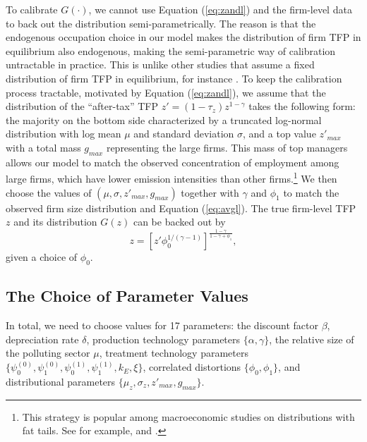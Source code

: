 \documentclass[AEJ]{AEA}
\begin{document}
To calibrate $G(\cdot)$, we cannot use Equation (\ref{eq:zandl}) and the firm-level data to back out the distribution semi-parametrically. The reason is that the endogenous occupation choice in our model makes the distribution of firm TFP in equilibrium also endogenous, making the semi-parametric way of calibration untractable in practice. This is unlike other studies that assume a fixed distribution of firm TFP in equilibrium, for instance \citet{BentoRestuccia:2016}. To keep the calibration process tractable, motivated by Equation (\ref{eq:zandl}), we assume that the distribution of the ``after-tax'' TFP $z' = (1-\tau_z)z^{1-\gamma}$ takes the following form: the majority on the bottom side characterized by a truncated log-normal distribution with log mean $\mu$ and standard deviation $\sigma$, and a top value $z'_{max}$ with a total mass $g_{max}$ representing the large firms. This mass of top managers allows our model to match the observed concentration of employment among large firms, which have lower emission intensities than other firms.\footnote{This strategy is popular among macroeconomic studies on distributions with fat tails. See for example, \citet{Castanedaetal:2003} and \citet{Guneretal:2008}.} We then choose the values of $(\mu, \sigma, z'_{max}, g_{max})$ together with $\gamma$ and $\phi_1$ to match the observed firm size distribution and Equation (\ref{eq:avgl}). The true firm-level TFP $z$ and its distribution $G(z)$ can be backed out by
\begin{equation*}
    z = \left[z'\phi_0^{1/(\gamma-1)}\right]^{\frac{1-\gamma}{1-\gamma+\phi_1}},
\end{equation*}
given a choice of $\phi_0$.

\subsection{The Choice of Parameter Values}

In total, we need to choose values for 17 parameters: the discount factor $\beta$, depreciation rate $\delta$, production technology parameters $\{\alpha, \gamma \}$, the relative size of the polluting sector $\mu$, treatment technology parameters $\{\psi_0^{(0)}, \psi_1^{(0)}, \psi_0^{(1)}, \psi_1^{(1)}, k_E, \xi \}$, correlated distortions $\{ \phi_0, \phi_1 \}$, and distributional parameters $\{\mu_z, \sigma_z, z'_{max}, g_{max}\}$.
\end{document}
